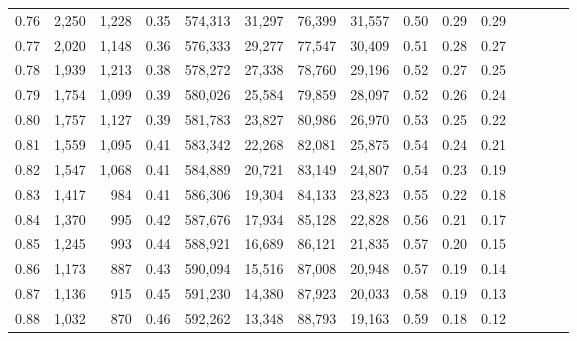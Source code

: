 \begin{tabular}{rrrcrrrrrrrrrrr}
0.76 &   2,250 &   1,228 &                                       0.35 &  574,313 &   31,297 &   76,399 &   31,557 &  0.50 &  0.29 &                         0.29 \\
0.77 &   2,020 &   1,148 &                                       0.36 &  576,333 &   29,277 &   77,547 &   30,409 &  0.51 &  0.28 &                         0.27 \\
0.78 &   1,939 &   1,213 &                                       0.38 &  578,272 &   27,338 &   78,760 &   29,196 &  0.52 &  0.27 &                         0.25 \\
0.79 &   1,754 &   1,099 &                                       0.39 &  580,026 &   25,584 &   79,859 &   28,097 &  0.52 &  0.26 &                         0.24 \\
0.80 &   1,757 &   1,127 &                                       0.39 &  581,783 &   23,827 &   80,986 &   26,970 &  0.53 &  0.25 &                         0.22 \\
0.81 &   1,559 &   1,095 &                                       0.41 &  583,342 &   22,268 &   82,081 &   25,875 &  0.54 &  0.24 &                         0.21 \\
0.82 &   1,547 &   1,068 &                                       0.41 &  584,889 &   20,721 &   83,149 &   24,807 &  0.54 &  0.23 &                         0.19 \\
0.83 &   1,417 &     984 &                                       0.41 &  586,306 &   19,304 &   84,133 &   23,823 &  0.55 &  0.22 &                         0.18 \\
0.84 &   1,370 &     995 &                                       0.42 &  587,676 &   17,934 &   85,128 &   22,828 &  0.56 &  0.21 &                         0.17 \\
0.85 &   1,245 &     993 &                                       0.44 &  588,921 &   16,689 &   86,121 &   21,835 &  0.57 &  0.20 &                         0.15 \\
0.86 &   1,173 &     887 &                                       0.43 &  590,094 &   15,516 &   87,008 &   20,948 &  0.57 &  0.19 &                         0.14 \\
0.87 &   1,136 &     915 &                                       0.45 &  591,230 &   14,380 &   87,923 &   20,033 &  0.58 &  0.19 &                         0.13 \\
0.88 &   1,032 &     870 &                                       0.46 &  592,262 &   13,348 &   88,793 &   19,163 &  0.59 &  0.18 &                         0.12 \\

\end{tabular}
